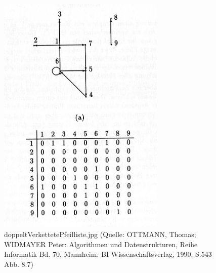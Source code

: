 \begin{figure}[h]
\centering
\includegraphics[width = 8cm]{./chapters/adjazenzmatrix.jpg}
\caption{doppeltVerkettetePfeilliste.jpg {\tiny (Quelle: OTTMANN, Thomas; WIDMAYER Peter: Algorithmen und Datenstrukturen, Reihe Informatik Bd. 70, Mannheim: BI-Wissenschaftsverlag, 1990, S.543 Abb. 8.7)} }
\label{a4}
\end{figure}


